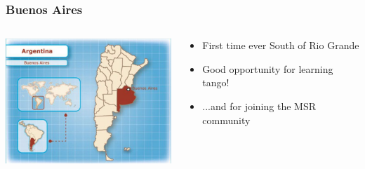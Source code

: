 \documentclass{beamer}
\begin{document}
\begin{frame}
\frametitle{Buenos Aires}

\begin{columns}[T]
\begin{column}{.50\textwidth}
\includegraphics[width=6.5cm]{figs/argentina-in-maps}

\end{column}%
\hfill%
\begin{column}{.48\textwidth}
{\Large
\begin{itemize}
\item First time ever South of Rio Grande
\item Good opportunity for learning tango!
\item ...and for joining the MSR community
\end{itemize}
}
\end{column}%
\end{columns}

\end{frame}
\end{document}
